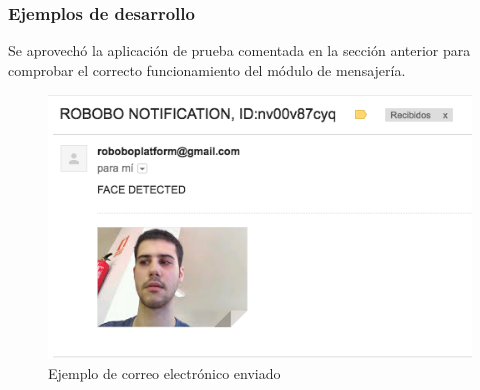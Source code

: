 \subsubsection*{Ejemplos de desarrollo}

Se aprovechó la aplicación de prueba comentada en la sección anterior para comprobar el correcto funcionamiento del módulo de mensajería.

\begin{figure}
	\centering
	\includegraphics[width=1\linewidth]{imagenes/mail_example.png}
	\caption{Ejemplo de correo electrónico enviado}
	\label{fig:mail-example}
\end{figure}






